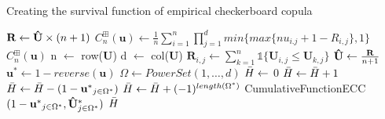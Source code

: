 \documentclass[12pt]{report}
\newcommand{\1}{\mathbf{1}}
\begin{document}
\begin{flushleft}
\begin{algorithm}[H]
\caption{Creating the survival function of empirical checkerboard copula}
\begin{algorithmic}
 
    \State $\textbf{R} \gets \mathbf{\Hat{U}} \times (n + 1)$
    \State $C^{\boxplus}_{n}(\textbf{u}) \gets \frac{1}{n}\sum\limits_{i = 1}^{n} \prod\limits_{j = 1}^{d} min\{max\{nu_{i.j} + 1 - R_{i,j}\}, 1\}$
    \State \Return $C^{\boxplus}_{n}(\textbf{u})$
\EndProcedure
{}
    \State n $\gets$ row($\mathbf{U}$)
    \State d $\gets$ col($\mathbf{U}$)
            \State $\textbf{R}_{i,j} \gets \sum\limits_{k = 1}^{n} \mathds{1} \{ \textbf{U}_{i,j} \le \textbf{U}_{k,j} \}$
        \EndFor
    \EndFor
    \State $\mathbf{\Hat{U}} \gets \frac{\mathbf{R}}{n + 1}$ 
    \State $\mathbf{u^{*}} \gets 1 - reverse(\textbf{u})$ 
    \State $\Omega \gets PowerSet(1, \dots, d)$ 
    \State $\Bar{H} \gets$ 0 
            \State $\Bar{H} \gets \Bar{H} + 1$
            \State $\Bar{H} \gets \Bar{H} - (1 - \mathbf{u^{*}}_{j \in \Omega^{*}})$ 
        \Else
            \State $\Bar{H} \gets \Bar{H} + (-1)^{length(\Omega^{*})}$ CumulativeFunctionECC$(1 - \mathbf{u^{*}}_{j \in \Omega^{*}}, \mathbf{\Hat{U}^{*}}_{j \in \Omega^{*}}) $
        \EndIf
    \EndFor
    \State \Return $\Bar{H}$
\EndProcedure
\end{algorithmic}
\end{algorithm}


\end{flushleft}
\end{document}
